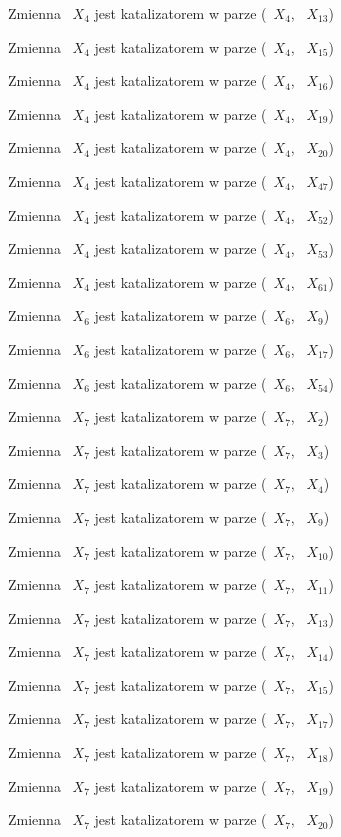 \documentclass{article}
\begin{document}
Zmienna ~$X_{4}$ jest katalizatorem w parze (~$X_{4}$, ~$X_{13}$)

Zmienna ~$X_{4}$ jest katalizatorem w parze (~$X_{4}$, ~$X_{15}$)

Zmienna ~$X_{4}$ jest katalizatorem w parze (~$X_{4}$, ~$X_{16}$)

Zmienna ~$X_{4}$ jest katalizatorem w parze (~$X_{4}$, ~$X_{19}$)

Zmienna ~$X_{4}$ jest katalizatorem w parze (~$X_{4}$, ~$X_{20}$)

Zmienna ~$X_{4}$ jest katalizatorem w parze (~$X_{4}$, ~$X_{47}$)

Zmienna ~$X_{4}$ jest katalizatorem w parze (~$X_{4}$, ~$X_{52}$)

Zmienna ~$X_{4}$ jest katalizatorem w parze (~$X_{4}$, ~$X_{53}$)

Zmienna ~$X_{4}$ jest katalizatorem w parze (~$X_{4}$, ~$X_{61}$)

Zmienna ~$X_{6}$ jest katalizatorem w parze (~$X_{6}$, ~$X_{9}$)

Zmienna ~$X_{6}$ jest katalizatorem w parze (~$X_{6}$, ~$X_{17}$)

Zmienna ~$X_{6}$ jest katalizatorem w parze (~$X_{6}$, ~$X_{54}$)

Zmienna ~$X_{7}$ jest katalizatorem w parze (~$X_{7}$, ~$X_{2}$)

Zmienna ~$X_{7}$ jest katalizatorem w parze (~$X_{7}$, ~$X_{3}$)

Zmienna ~$X_{7}$ jest katalizatorem w parze (~$X_{7}$, ~$X_{4}$)

Zmienna ~$X_{7}$ jest katalizatorem w parze (~$X_{7}$, ~$X_{9}$)

Zmienna ~$X_{7}$ jest katalizatorem w parze (~$X_{7}$, ~$X_{10}$)

Zmienna ~$X_{7}$ jest katalizatorem w parze (~$X_{7}$, ~$X_{11}$)

Zmienna ~$X_{7}$ jest katalizatorem w parze (~$X_{7}$, ~$X_{13}$)

Zmienna ~$X_{7}$ jest katalizatorem w parze (~$X_{7}$, ~$X_{14}$)

Zmienna ~$X_{7}$ jest katalizatorem w parze (~$X_{7}$, ~$X_{15}$)

Zmienna ~$X_{7}$ jest katalizatorem w parze (~$X_{7}$, ~$X_{17}$)

Zmienna ~$X_{7}$ jest katalizatorem w parze (~$X_{7}$, ~$X_{18}$)

Zmienna ~$X_{7}$ jest katalizatorem w parze (~$X_{7}$, ~$X_{19}$)

Zmienna ~$X_{7}$ jest katalizatorem w parze (~$X_{7}$, ~$X_{20}$)
\end{document}
